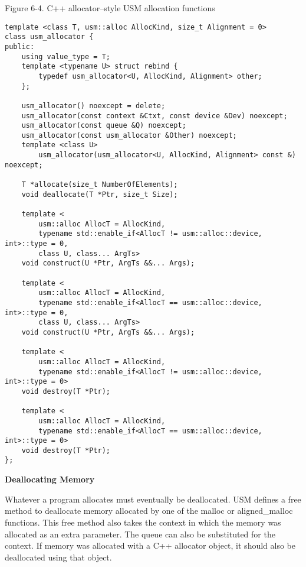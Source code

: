 \hspace*{\fill} \par %
Figure 6-4. C++ allocator–style USM allocation functions
\begin{lstlisting}[caption={}]
template <class T, usm::alloc AllocKind, size_t Alignment = 0>
class usm_allocator {
public:
	using value_type = T;
	template <typename U> struct rebind {
		typedef usm_allocator<U, AllocKind, Alignment> other;
	};

	usm_allocator() noexcept = delete;
	usm_allocator(const context &Ctxt, const device &Dev) noexcept;
	usm_allocator(const queue &Q) noexcept;
	usm_allocator(const usm_allocator &Other) noexcept;
	template <class U> 
		usm_allocator(usm_allocator<U, AllocKind, Alignment> const &) noexcept;
		
	T *allocate(size_t NumberOfElements); 
	void deallocate(T *Ptr, size_t Size); 
	
	template <
		usm::alloc AllocT = AllocKind,
		typename std::enable_if<AllocT != usm::alloc::device, int>::type = 0,
		class U, class... ArgTs>
	void construct(U *Ptr, ArgTs &&... Args); 
	
	template <
		usm::alloc AllocT = AllocKind,
		typename std::enable_if<AllocT == usm::alloc::device, int>::type = 0,
		class U, class... ArgTs>
	void construct(U *Ptr, ArgTs &&... Args); 
	
	template <
		usm::alloc AllocT = AllocKind,
		typename std::enable_if<AllocT != usm::alloc::device, int>::type = 0>
	void destroy(T *Ptr);
	
	template <
		usm::alloc AllocT = AllocKind,
		typename std::enable_if<AllocT == usm::alloc::device, int>::type = 0>
	void destroy(T *Ptr);
};
\end{lstlisting}

\hspace*{\fill} \par %
\textbf{Deallocating Memory}

Whatever a program allocates must eventually be deallocated. USM defines a free method to deallocate memory allocated by one of the malloc or aligned\_malloc functions. This free method also takes the context in which the memory was allocated as an extra parameter. The queue can also be substituted for the context. If memory was allocated with a C++ allocator object, it should also be deallocated using that object.\par

